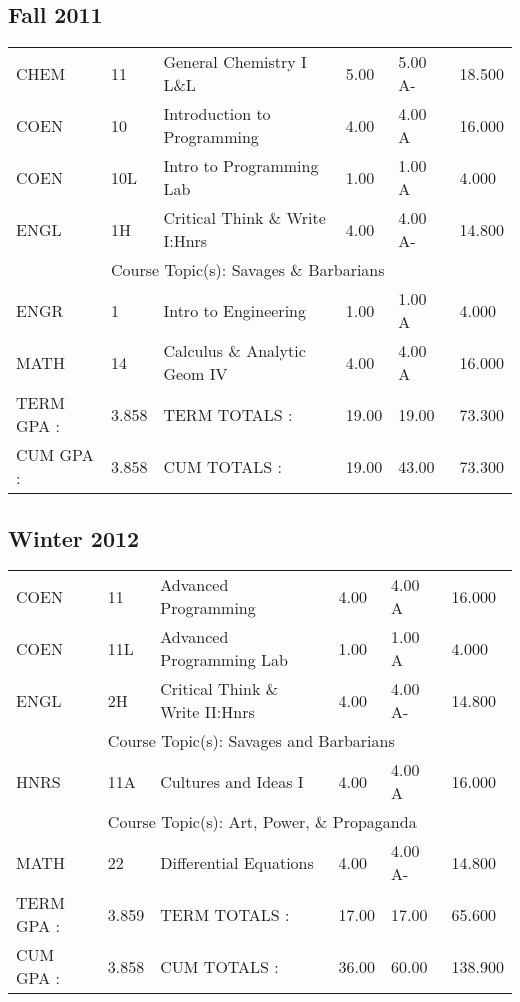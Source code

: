 \documentclass{article}\usepackage[T1]{fontenc}
\begin{document}
\subsection{Fall 2011}
\begin{tabular}{ l  l  l  l  l  l }
CHEM&11&General Chemistry I L\&L&5.00&5.00 A-&18.500\\
COEN&10&Introduction to Programming&4.00&4.00 A&16.000\\
COEN&10L&Intro to Programming Lab&1.00&1.00 A&4.000\\
ENGL&1H&Critical Think \& Write I:Hnrs&4.00&4.00 A-&14.800\\
&
\multicolumn{5}{l}{Course Topic(s): Savages \& Barbarians}
\\
ENGR&1&Intro to Engineering&1.00&1.00 A&4.000\\
MATH&14&Calculus \& Analytic Geom IV&4.00&4.00 A&16.000\\
\hline
TERM GPA :&3.858&TERM TOTALS :&19.00&19.00&73.300\\
CUM GPA :&3.858&CUM TOTALS :&19.00&43.00&73.300\\\end{tabular}
\subsection{Winter 2012}
\begin{tabular}{ l  l  l  l  l  l }
COEN&11&Advanced Programming&4.00&4.00 A&16.000\\
COEN&11L&Advanced Programming Lab&1.00&1.00 A&4.000\\
ENGL&2H&Critical Think \& Write II:Hnrs&4.00&4.00 A-&14.800\\
&
\multicolumn{5}{l}{Course Topic(s): Savages and Barbarians}
\\
HNRS&11A&Cultures and Ideas I&4.00&4.00 A&16.000\\
&
\multicolumn{5}{l}{Course Topic(s): Art, Power, \& Propaganda}
\\
MATH&22&Differential Equations&4.00&4.00 A-&14.800\\
\hline
TERM GPA :&3.859&TERM TOTALS :&17.00&17.00&65.600\\
CUM GPA :&3.858&CUM TOTALS :&36.00&60.00&138.900\\\end{tabular}
\end{document}
